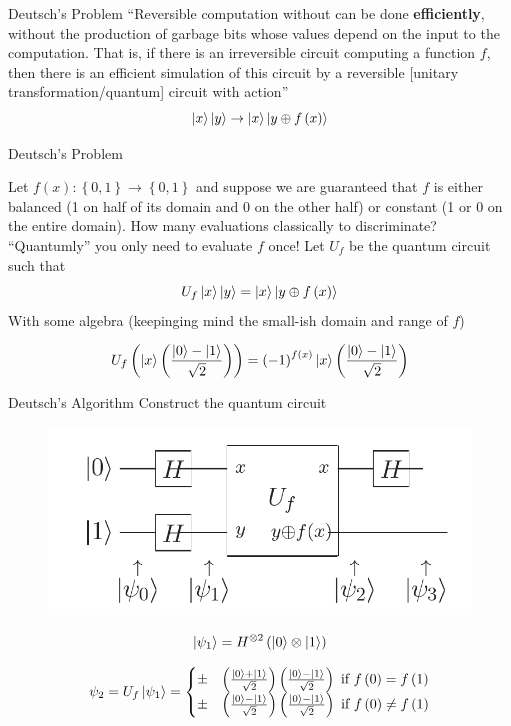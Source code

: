 \documentclass{beamer}
\begin{document}
\begin{frame}{Deutsch's Problem}
``Reversible computation without can be done \textbf{efficiently}, without the production of garbage bits whose values depend on the input to the computation. That is, if there is an irreversible circuit computing a function $f$, then there is an efficient simulation of this circuit by a reversible [unitary transformation/quantum] circuit with action''\cite{Nielsen:2011:QCQ:1972505}
\[
\Ket{x}\Ket{y}\to\Ket{x}\Ket{y\oplus f\left(x\right)}
\]

\end{frame}


\begin{frame}{Deutsch's Problem}

Let $f\left(x\right):\left\{ 0,1\right\} \to\left\{ 0,1\right\}$ and suppose we are guaranteed that $f$ is either balanced (1 on half of its domain and 0 on the other half)
or constant (1 or 0 on the entire domain). How many evaluations classically to discriminate? ``Quantumly'' you only need
to evaluate $f$ once! Let $U_f$ be the quantum circuit such that 
\[
U_f\Ket{x}\Ket{y}=\Ket{x}\Ket{y\oplus f\left(x\right)}
\]
With some algebra (keepinging mind the small-ish domain and range of $f$)

\[
U_{f}\left(\Ket{x}\left(\frac{\Ket{0}-\Ket{1}}{\sqrt{2}}\right)\right)=\left(-1\right)^{f\left(x\right)}\Ket{x}\left(\frac{\Ket{0}-\Ket{1}}{\sqrt{2}}\right)
\]
\end{frame}


\begin{frame}{Deutsch's Algorithm}
Construct the quantum circuit
\begin{figure}[ht]
  \includegraphics[scale=0.33]{pasted1}
\end{figure}
\[
\Ket{\psi_{1}} = H^{\otimes2}\left(\Ket{0}\otimes\Ket{1}\right)
\]

\[
\psi_{2}=U_{f}\Ket{\psi_{1}}=\begin{cases}
\pm & \left(\frac{\Ket{0}+\Ket{1}}{\sqrt{2}}\right)\left(\frac{\Ket{0}-\Ket{1}}{\sqrt{2}}\right)\text{ if }f\left(0\right)=f\left(1\right)\\
\pm & \left(\frac{\Ket{0}-\Ket{1}}{\sqrt{2}}\right)\left(\frac{\Ket{0}-\Ket{1}}{\sqrt{2}}\right)\text{ if }f\left(0\right)\neq f\left(1\right)
\end{cases}
\]

\end{frame}
\end{document}
